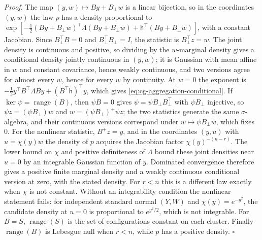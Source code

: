 \noindent\emph{Proof.}
The map \((y,w)\mapsto By+B_\perp w\) is a linear bijection, so in the
coordinates \((y,w)\) the law \(p\) has a density proportional to
\(\exp[-\frac12(By+B_\perp w)^\top\Lambda(By+B_\perp w)
+\mathsf h^\top(By+B_\perp w)]\), with a constant Jacobian. Since
\(B_\perp^\top B=0\) and \(B_\perp^\top B_\perp=I\), the statistic is
\(B_\perp^\top z=w\). The joint density is continuous and positive, so dividing
by the \(w\)-marginal density gives a conditional density jointly continuous in
\((y,w)\); it is Gaussian with mean affine in \(w\) and constant covariance,
hence weakly continuous, and two versions agree for almost every \(w\), hence
for every \(w\) by continuity. At \(w=0\) the exponent is
\(-\frac12y^\top B^\top\Lambda By+(B^\top\mathsf h)^\top y\), which gives
\eqref{eq:cg-aggregation-conditional}. If \(\ker\psi=\operatorname{range}(B)\),
then \(\psi B=0\) gives \(\psi=\psi B_\perp B_\perp^\top\) with \(\psi B_\perp\)
injective, so \(\psi z=(\psi B_\perp)w\) and \(w=(\psi B_\perp)^+\psi z\); the two
statistics generate the same \(\sigma\)-algebra, and their continuous versions
correspond under \(w\mapsto\psi B_\perp w\), which fixes \(0\). For the
nonlinear statistic, \(B^+z=y\), and in the coordinates \((y,u)\) with
\(u=\chi(y)w\) the density of \(p\) acquires the Jacobian factor
\(\chi(y)^{-(n-r)}\). The lower bound on \(\chi\) and positive definiteness of
\(\Lambda\) bound these joint densities near \(u=0\) by an integrable Gaussian
function of \(y\). Dominated convergence therefore gives a positive finite marginal
density and a weakly continuous conditional version at zero, with the stated density.
For \(r<n\) this is a different law exactly when \(\chi\) is not constant.
Without an integrability condition the nonlinear statement fails: for independent standard
normal \((Y,W)\) and \(\chi(y)=e^{-y^2}\), the candidate density at \(u=0\) is
proportional to \(e^{y^2/2}\), which is not integrable. For \(B=S\), \(\operatorname{range}(S)\) is the set of configurations
constant on each cluster. Finally \(\operatorname{range}(B)\) is Lebesgue null
when \(r<n\), while \(p\) has a positive density. \(\square\)

